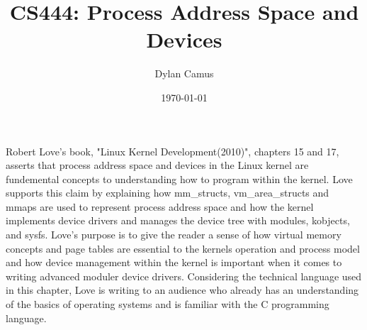 \documentclass[letterpaper,10pt]{article}
\title{CS444: Process Address Space and Devices}
\author{Dylan Camus}
\date{\today}
\begin{document}
\maketitle
Robert Love's book, "Linux Kernel Development(2010)", chapters 15 and 17, asserts that process address space and devices in the Linux kernel are fundemental concepts to understanding how to program within the kernel. Love supports this claim by explaining how mm\_structs, vm\_area\_structs and mmaps are used to represent process address space and how the kernel implements device drivers and manages the device tree with modules, kobjects, and sysfs. Love's purpose is to give the reader a sense of how virtual memory concepts and page tables are essential to the kernels operation and process model and how device management within the kernel is important when it comes to writing advanced moduler device drivers. Considering the technical language used in this chapter, Love is writing to an audience who already has an understanding of the basics of operating systems and is familiar with the C programming language.
\end{document}
